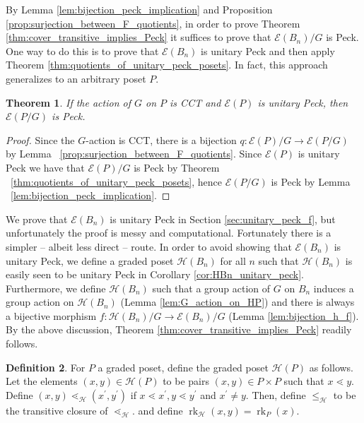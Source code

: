 \documentclass[10 pt]{amsart}
\theoremstyle{plain}
\newtheorem{thm}{Theorem}[section]
\theoremstyle{definition}
\newtheorem{defn}[thm]{Definition}
\theoremstyle{remark}
\numberwithin{equation}{section}
\newcommand\rk{\operatorname{rk}}
\begin{document}
By Lemma \ref{lem:bijection_peck_implication} and Proposition \ref{prop:surjection_between_F_quotients}, in order to prove Theorem \ref{thm:cover_transitive_implies_Peck} it suffices to prove that $\mathcal E(B_n)/G$ is Peck.  One way to do this is to prove that $\mathcal E(B_n)$ is unitary Peck and then apply Theorem \ref{thm:quotients_of_unitary_peck_posets}.  In fact, this approach generalizes to an arbitrary poset $P$.

\begin{thm}
If the action of $G$ on $P$ is CCT and $\mathcal E(P)$ is unitary Peck, then $\mathcal E(P/G)$ is Peck.
\end{thm}
\begin{proof}
Since the $G$-action is CCT, there is a bijection $q\colon\mathcal{E}(P)/G \rightarrow \mathcal{E}(P/G)$ by Lemma ~\ref{prop:surjection_between_F_quotients}.  Since $\mathcal{E}(P)$ is unitary Peck we have that $\mathcal{E}(P)/G$ is Peck by Theorem ~\ref{thm:quotients_of_unitary_peck_posets}, hence $\mathcal{E}(P/G)$ is Peck by Lemma ~\ref{lem:bijection_peck_implication}.
\end{proof}






We prove that $\mathcal E(B_n)$ is unitary Peck in Section \ref{sec:unitary_peck_f}, but unfortunately the proof is messy and computational.  Fortunately there is a simpler -- albeit less direct -- route.  In order to avoid showing that $\mathcal E(B_n)$ is unitary Peck, we define a graded poset $\mathcal{H}(B_n)$ for all $n$ such that $\mathcal{H}(B_n)$ is easily seen to be unitary Peck in Corollary \ref{cor:HBn_unitary_peck}. Furthermore, we define $\mathcal{H}(B_n)$ such that a group action of $G$ on $B_n$ induces a group action on $\mathcal{H}(B_n)$ (Lemma \ref{lem:G_action_on_HP}) and there is always a bijective morphism $f\colon \mathcal{H}(B_n)/G\rightarrow \mathcal E(B_n)/G$ (Lemma \ref{lem:bijection_h_f}).  By the above discussion, Theorem \ref{thm:cover_transitive_implies_Peck} readily follows.

\begin{defn}
\label{defn:h_map}
For $P$ a graded poset, define the graded poset $\mathcal H(P)$ as follows. Let the elements $(x, y) \in \mathcal H(P)$ to be pairs $(x,y) \in P\times P$ such that $x \lessdot y$.  Define $(x, y) \lessdot_{\mathcal H} (x^\prime, y^\prime)$ if $x \lessdot x^\prime,y\lessdot y^\prime$ and $x^\prime \neq y.$ Then, define $\leq_{\mathcal H}$ to be the transitive closure of $\lessdot_{\mathcal H}.$ and define $\rk_{\mathcal H}(x, y) = \rk_P(x).$
\end{defn}
\end{document}
